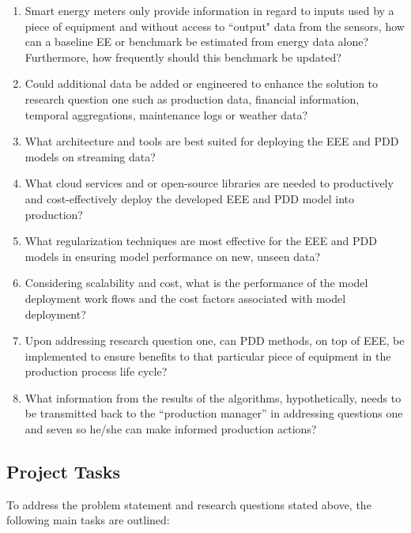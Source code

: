 \begin{enumerate}

    \item Smart energy meters only provide information in regard to inputs used by a piece of equipment and without access to ``output" data from the sensors, how can a baseline EE or benchmark be estimated from energy data alone? Furthermore, how frequently should this benchmark be updated?
    
    \item Could additional data be added or engineered to enhance the solution to research question one such as production data, financial information, temporal aggregations, maintenance logs or weather data?
    
    \item What architecture and tools are best suited for deploying the EEE and PDD models on streaming data?
    
    \item What cloud services and or open-source libraries are needed to productively and cost-effectively deploy the developed EEE and PDD model into production? 
    
    \item What regularization techniques are most effective for the EEE and PDD models in ensuring model performance on new, unseen data?
    
    \item Considering scalability and cost, what is the performance of the model deployment work flows and the cost factors associated with model deployment?
    
    \item Upon addressing research question one, can PDD methods, on top of EEE, be implemented to ensure benefits to that particular piece of equipment in the production process life cycle?
    
    \item What information from the results of the algorithms, hypothetically, needs to be transmitted back to the “production manager” in addressing questions one and seven so he/she can make informed production actions?
    
\end{enumerate}

\subsection{Project Tasks}

To address the problem statement and research questions stated above, the following main tasks are outlined:

